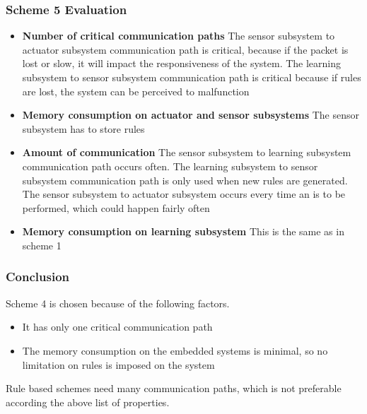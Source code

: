 \subsubsection{Scheme 5 Evaluation}
\begin{itemize}
\item \textbf{Number of critical communication paths} The sensor subsystem to actuator subsystem communication path is critical, because if the packet is lost or slow, it will impact the responsiveness of the system. The learning subsystem to sensor subsystem communication path is critical because if rules are lost, the system can be perceived to malfunction
\item \textbf{Memory consumption on actuator and sensor subsystems} The sensor subsystem has to store rules
\item \textbf{Amount of communication} The sensor subsystem to learning subsystem communication path occurs often. The learning subsystem to sensor subsystem communication path is only used when new rules are generated. The sensor subsystem to actuator subsystem occurs every time an is to be performed, which could happen fairly often
\item \textbf{Memory consumption on learning subsystem} This is the same as in scheme 1
\end{itemize}

\subsubsection{Conclusion}
Scheme 4 is chosen because of the following factors.
\begin{itemize}
\item It has only one critical communication path
\item The memory consumption on the embedded systems is minimal, so no limitation on rules is imposed on the system
\end{itemize}

Rule based schemes need many communication paths, which is not preferable according the above list of properties.
